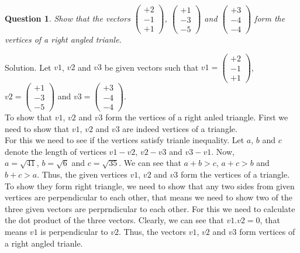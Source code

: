 \documentclass{article}
\newtheorem{question}[theorem]{Question}
\begin{document}
\begin{question}
	Show that the vectors $\begin{pmatrix} 
		 +2\\-1\\+1 
	\end{pmatrix}$, $\begin{pmatrix} 
	 +1\\-3\\-5 
\end{pmatrix}$ and $\begin{pmatrix} 
+3\\-4\\-4 
\end{pmatrix}$ form the vertices of a right angled trianle.
\end{question}
Solution. Let $v1$, $v2$ and $v3$ be given vectors such that $v1 =\begin{pmatrix} 
	+2\\-1\\+1 
\end{pmatrix}$,\\     
$v2= \begin{pmatrix} 
+1\\-3\\-5 
\end{pmatrix}$ and $v3= \begin{pmatrix} 
+3\\-4\\-4 
\end{pmatrix}$.\\
To show that $v1$, $v2$ and $v3$ form the vertices of a right anled triangle. First we need to show that $v1$, $v2$ and $v3$ are indeed vertices of a triangle.\\
For this we need to see if the vertices satisfy trianle inequality. Let $a$, $b$ and $c$ denote the length of vertices $v1-v2$, $v2-v3$ and $v3-v1$. Now,\\
$a=\sqrt{41}$, $b=\sqrt{6}$ and $c=\sqrt{35}$. We can see that  $a+b>c$, 
$a+c>b$ and $b+c >a$. Thus, the given vertices $v1$, $v2$ and $v3$ form the vertices of a triangle.\\
To show they form right triangle, we need to show that any two sides from given vertices are perpendicular to each other, that means we need to show two of the three given vectors are perprndicular to each other. For this we need to calculate the dot product of the three vectors. Clearly, we can see that $v1.v2 =0$, that means $v1$ is perpendicular to $v2$. Thus, the vectors $v1$, $v2$ and $v3$ form vertices of a right angled trianle.  
\end{document}
